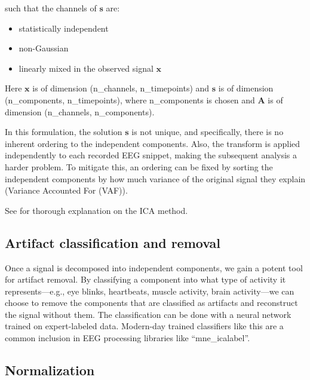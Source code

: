 such that the channels of \( \mathbf{s} \) are:
\begin{itemize}
  \item{statistically independent}
  \item{non-Gaussian}
  \item{linearly mixed in the observed signal \( \mathbf{x} \)}
\end{itemize}
Here \( \mathbf{x} \) is of dimension (n\_channels, n\_timepoints) 
and \( \mathbf{s} \) is of dimension (n\_components, n\_timepoints), 
where n\_components is chosen and \( \mathbf{A} \) is of dimension (n\_channels, n\_components).

In this formulation, the solution \( \mathbf{s} \) is not unique, and specifically, there is no inherent ordering to the independent components.
Also, the transform is applied independently to each recorded EEG snippet, making the subsequent analysis a harder problem.
To mitigate this, an ordering can be fixed by sorting the independent components by how much variance of the original signal they explain (Variance Accounted For (VAF)).

See \cite{frolich} for thorough explanation on the ICA method.

\subsection{Artifact classification and removal}

Once a signal is decomposed into independent components, we gain a potent tool for artifact removal.
By classifying a component into what type of activity it represents---e.g., eye blinks, heartbeats, muscle activity, brain activity---we can choose to remove the components that are classified as artifacts and reconstruct the signal without them.
The classification can be done with a neural network trained on expert-labeled data\cite{iclabel}. Modern-day trained classifiers like this are a common inclusion in EEG processing libraries like ``mne\_icalabel''.

\subsection{Normalization}

